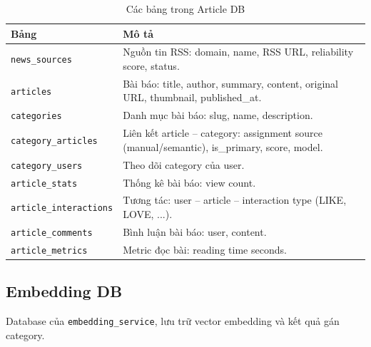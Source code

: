 \documentclass[14pt,a4paper,oneside]{extreport}
\begin{document}
\begin{table}[H]
\centering
\caption{Các bảng trong Article DB}
\label{tab:er-article}
\renewcommand{\arraystretch}{1.3}
\small
\begin{tabularx}{\textwidth}{|l|X|}
\hline
\textbf{Bảng} & \textbf{Mô tả} \\
\hline
\texttt{news\_sources} & Nguồn tin RSS: domain, name, RSS URL, reliability score, status. \\
\hline
\texttt{articles} & Bài báo: title, author, summary, content, original URL, thumbnail, published\_at. \\
\hline
\texttt{categories} & Danh mục bài báo: slug, name, description. \\
\hline
\texttt{category\_articles} & Liên kết article -- category: assignment source (manual/semantic), is\_primary, score, model. \\
\hline
\texttt{category\_users} & Theo dõi category của user. \\
\hline
\texttt{article\_stats} & Thống kê bài báo: view count. \\
\hline
\texttt{article\_interactions} & Tương tác: user -- article -- interaction type (LIKE, LOVE, ...). \\
\hline
\texttt{article\_comments} & Bình luận bài báo: user, content. \\
\hline
\texttt{article\_metrics} & Metric đọc bài: reading time seconds. \\
\hline
\end{tabularx}
\end{table}

\subsection{Embedding DB}

Database của \texttt{embedding\_service}, lưu trữ vector embedding và kết quả gán category.
\end{document}

